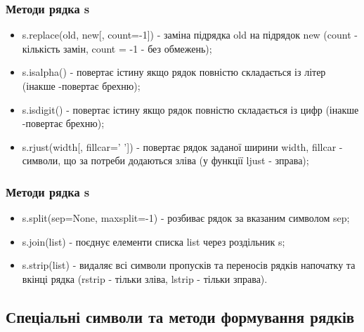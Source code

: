 \begin{frame}
\frametitle{Методи рядка s}
\begin{itemize}
 \item s.replace(old, new[, count=-1]) - заміна підрядка old на підрядок new (count - кількість замін, count = -1 - без обмежень);
 \item s.isalpha() - повертає істину якщо рядок повністю складається із літер (інакше -повертає брехню);
 \item s.isdigit() - повертає істину якщо рядок повністю складається із цифр (інакше -повертає брехню);
 \item s.rjust(width[, fillcar=' ']) - повертає рядок заданої ширини width, fillcar - символи, що за потреби додаються зліва (у функції ljust - зправа);
\end{itemize}
\end{frame}

\begin{frame}
\frametitle{Методи рядка s}
\begin{itemize}
 \item s.split(sep=None, maxsplit=-1) - розбиває рядок за вказаним символом sep;
 \item s.join(list) - поєднує елементи списка list через роздільник s;
 \item s.strip(list) - видаляє всі символи пропусків та переносів рядків напочатку та вкінці рядка (rstrip - тільки зліва, lstrip - тільки зправа).
\end{itemize}
\end{frame}

\subsection{Спеціальні символи та методи формування рядків}

